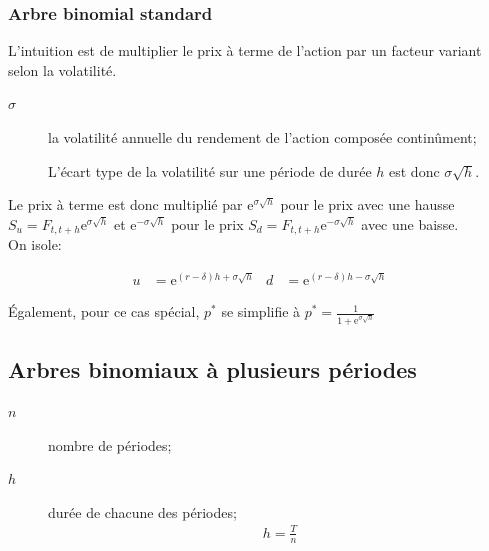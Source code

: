 \documentclass[10pt, french]{article}
\begin{document}
\begin{multicols*}{2}
\subsubsection*{Arbre binomial standard}
L'intuition est de multiplier le prix à terme de l'action par un facteur variant selon la volatilité.

\begin{distributions}[Notation]
\begin{description}
	\item[$\sigma$]	la volatilité annuelle du rendement de l'action composée continûment;
	\item[]	L'écart type de la volatilité sur une période de durée $h$ est donc $\sigma \sqrt{h}$.
\end{description}
\end{distributions}

Le prix à terme est donc multiplié par $\textrm{e}^{\sigma \sqrt{h}}$ pour le prix avec une hausse $S_{u} = F_{t, t + h}\textrm{e}^{\sigma \sqrt{h}}$ et $\textrm{e}^{-\sigma \sqrt{h}}$ pour le prix $S_{d} = F_{t, t + h}\textrm{e}^{-\sigma \sqrt{h}}$ avec une baisse.\\

On isole:
\begin{rappel}{}
	\begin{align*}
	u	&=	\textrm{e}^{(r - \delta)h + \sigma \sqrt{h}}	&
	d	&=	\textrm{e}^{(r - \delta)h - \sigma \sqrt{h}}
	\end{align*}
\end{rappel}

Également, pour ce cas spécial, $p^{*}$ se simplifie à $p^{*}	=	\frac{1}{1 + \textrm{e}^{\sigma \sqrt{h}}}$

\subsection{Arbres binomiaux à plusieurs périodes}

\begin{distributions}[Notation]
\begin{description}
	\item[$n$]	nombre de périodes;
	\item[$h$]	durée de chacune des périodes;
		\begin{align*}
		h	=	\frac{T}{n}
		\end{align*}
\end{description}
\end{distributions}


\end{multicols*}
\end{document}
